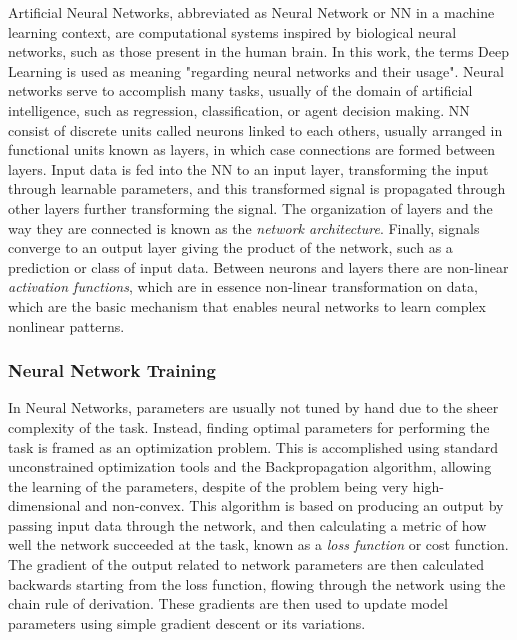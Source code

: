 Artificial Neural Networks, abbreviated as Neural Network or NN in a machine learning context, are computational systems inspired by biological neural networks, such as those present in the human brain. In this work, the terms Deep Learning is used as meaning "regarding neural networks and their usage". Neural networks serve to accomplish many tasks, usually of the domain of artificial intelligence, such as regression, classification, or agent decision making. NN consist of discrete units called neurons linked to each others, usually arranged in functional units known as layers, in which case connections are formed between layers. Input data is fed into the NN to an input layer, transforming the input through learnable parameters, and this transformed signal is propagated through other layers further transforming the signal. The organization of layers and the way they are connected is known as the \textit{network architecture}. Finally, signals converge to an output layer giving the product of the network, such as a prediction or class of input data. Between neurons and layers there are non-linear \textit{activation functions}, which are in essence non-linear transformation on data, which are the basic mechanism that enables neural networks to learn complex nonlinear patterns.

\subsubsection*{Neural Network Training}

In Neural Networks, parameters are usually not tuned by hand due to the sheer complexity of the task. Instead, finding optimal parameters for performing the task is framed as an optimization problem. This is accomplished using standard unconstrained optimization tools and the Backpropagation algorithm, allowing the learning of the parameters, despite of the problem being very high-dimensional and non-convex. This algorithm is based on producing an output by passing input data through the network, and then calculating a metric of how well the network succeeded at the task, known as a \textit{loss function} or cost function. The gradient of the output related to network parameters are then calculated backwards starting from the loss function, flowing through the network using the chain rule of derivation. These gradients are then used to update model parameters using simple gradient descent or its variations. 


